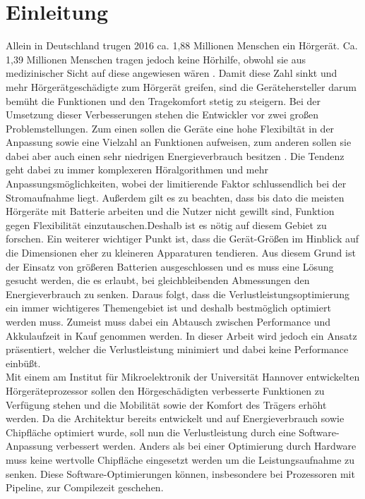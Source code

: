 
\thispagestyle{empty}
%
\chapter{Einleitung}
\label{chap:introduction}
Allein in Deutschland trugen 2016 ca. 1,88 Millionen Menschen ein Hörgerät. Ca. 1,39 Millionen Menschen tragen jedoch keine Hörhilfe, obwohl sie aus medizinischer Sicht auf diese angewiesen wären \cite{statistica}. Damit diese Zahl sinkt und mehr Hörgerätgeschädigte zum Hörgerät greifen, sind die Gerätehersteller darum bemüht die Funktionen und den Tragekomfort stetig zu steigern.
Bei der Umsetzung dieser Verbesserungen stehen die Entwickler vor zwei großen Problemstellungen. Zum einen sollen die Geräte eine hohe Flexibiltät in der Anpassung sowie eine Vielzahl an Funktionen aufweisen, zum anderen sollen sie dabei aber auch einen sehr niedrigen Energieverbrauch besitzen \cite{lee2007low}. Die Tendenz geht dabei zu immer komplexeren Höralgorithmen und mehr Anpassungsmöglichkeiten, wobei der limitierende Faktor schlussendlich bei der Stromaufnahme liegt.
Außerdem gilt es zu beachten, dass bis dato die meisten Hörgeräte mit Batterie arbeiten und die Nutzer nicht gewillt sind, Funktion gegen Flexibilität einzutauschen.Deshalb ist es nötig auf diesem Gebiet zu forschen. Ein weiterer wichtiger Punkt ist, dass die Gerät-Größen im Hinblick auf die Dimensionen eher zu kleineren Apparaturen tendieren. Aus diesem Grund ist der Einsatz von größeren Batterien ausgeschlossen und es muss eine Lösung gesucht werden, die es erlaubt, bei gleichbleibenden Abmessungen den Energieverbrauch zu senken. Daraus folgt, dass die Verlustleistungsoptimierung ein immer wichtigeres Themengebiet ist und deshalb bestmöglich optimiert werden muss. 
Zumeist muss dabei ein Abtausch zwischen Performance und Akkulaufzeit in Kauf genommen werden. In dieser Arbeit wird jedoch ein Ansatz präsentiert, welcher die Verlustleistung minimiert und dabei keine Performance einbüßt.\\
Mit einem am Institut für Mikroelektronik der Universität Hannover entwickelten Hörgeräteprozessor sollen den Hörgeschädigten verbesserte Funktionen zu Verfügung stehen und die Mobilität sowie der Komfort des Trägers erhöht werden. Da die Architektur bereits entwickelt und auf Energieverbrauch sowie Chipfläche optimiert wurde, soll nun die Verlustleistung durch eine Software-Anpassung verbessert werden. Anders als bei einer Optimierung durch Hardware muss keine wertvolle Chipfläche eingesetzt werden um die Leistungsaufnahme zu senken. Diese Software-Optimierungen können, insbesondere bei Prozessoren mit Pipeline, zur Compilezeit geschehen.\\
